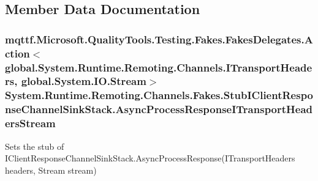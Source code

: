 \subsection{Member Data Documentation}
\hypertarget{class_system_1_1_runtime_1_1_remoting_1_1_channels_1_1_fakes_1_1_stub_i_client_response_channel_sink_stack_ad21faa5cf213db81addf3a4f4d23fb10}{
\subsubsection[{Async\-Process\-Response\-I\-Transport\-Headers\-Stream}]{\setlength{\rightskip}{0pt plus 5cm}mqttf.\-Microsoft.\-Quality\-Tools.\-Testing.\-Fakes.\-Fakes\-Delegates.\-Action$<$global.\-System.\-Runtime.\-Remoting.\-Channels.\-I\-Transport\-Headers, global.\-System.\-I\-O.\-Stream$>$ System.\-Runtime.\-Remoting.\-Channels.\-Fakes.\-Stub\-I\-Client\-Response\-Channel\-Sink\-Stack.\-Async\-Process\-Response\-I\-Transport\-Headers\-Stream}}\label{class_system_1_1_runtime_1_1_remoting_1_1_channels_1_1_fakes_1_1_stub_i_client_response_channel_sink_stack_ad21faa5cf213db81addf3a4f4d23fb10}


Sets the stub of I\-Client\-Response\-Channel\-Sink\-Stack.\-Async\-Process\-Response(\-I\-Transport\-Headers headers, Stream stream)


